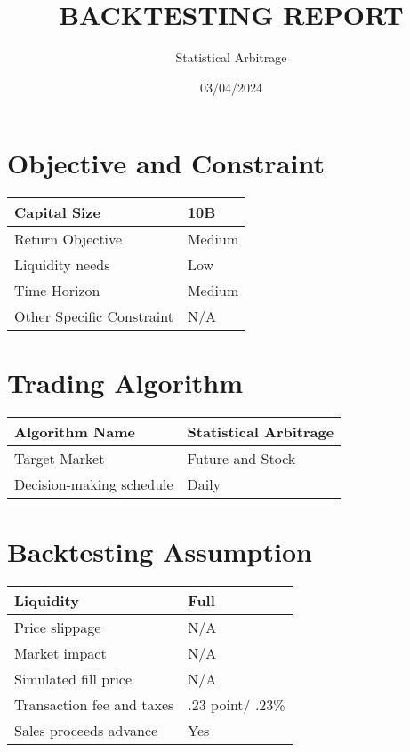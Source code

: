 \documentclass{article}
\title{BACKTESTING REPORT}
\author{Statistical Arbitrage}
\date{03/04/2024}
\begin{document}
\maketitle

\section{Objective and Constraint}

\begin{table}[ht]
\centering
\begin{tabular}{|l|l|}
\hline
Capital Size              & 10B \\ \hline
Return Objective          & Medium \\ \hline
Liquidity needs           & Low \\ \hline
Time Horizon              & Medium \\ \hline
Other Specific Constraint & N/A \\ \hline
\end{tabular}
\label{tab:objective-constraint}
\end{table}

\section{Trading Algorithm}
\begin{table}[ht]
\centering
\begin{tabular}{|l|l|}
\hline
Algorithm Name           & Statistical Arbitrage  \\ \hline
Target Market            & Future and Stock \\ \hline
Decision-making schedule & Daily \\ \hline
\end{tabular}
\label{tab:trading-algo}
\end{table}

\section{Backtesting Assumption}
\begin{table}[ht]
\centering
\begin{tabular}{|l|l|}
\hline
Liquidity                 & Full \\ \hline
Price slippage            & N/A \\ \hline
Market impact             & N/A \\ \hline
Simulated fill price      & N/A \\ \hline
Transaction fee and taxes & .23 point/ .23\% \\ \hline
Sales proceeds advance    &  Yes\\ \hline
\end{tabular}
\label{tab:backtesting-assumption}
\end{table}
\end{document}
